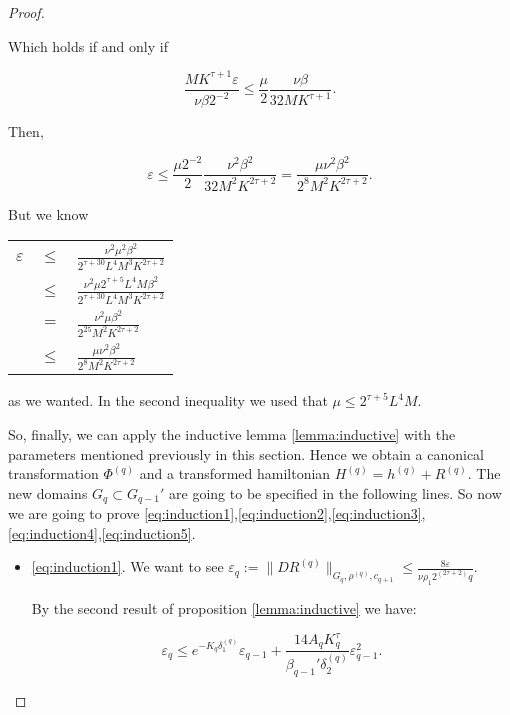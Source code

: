 \begin{proof}
\begin{enumerate}
\begin{itemize}
\begin{enumerate}
Which holds if and only if

$$\frac{M K^{\tau+1} \varepsilon}{\nu \beta 2^{-2}} \leq \frac{\mu}{2}\frac{\nu \beta}{32 M K^{\tau+1}}.$$

Then,

$$\varepsilon \leq \frac{\mu 2^{-2}}{2}\frac{\nu^2 \beta^2}{32 M^2 K^{2\tau+2}} = \frac{\mu \nu^2 \beta^2}{2^8 M^2 K^{2\tau+2}}.$$


But we know

\begin{longtable}{rcl}
$\varepsilon $ & $\leq$ & $\frac{\nu^2 \mu^2 \beta^2}{2^{\tau+30} L^4 M^3 K^{2\tau+2}}$ \\
& $\leq$ & $\frac{\nu^2 \mu 2^{\tau+5}L^4M\beta^2}{2^{\tau+30}L^4 M^3 K^{2\tau+2}}$ \\
& $=$ & $\frac{\nu^2 \mu \beta^2}{2^25 M^2 K^{2\tau+2}}$ \\
& $\leq$ & $\frac{\mu \nu^2 \beta^2}{2^8 M^2 K^{2\tau+2}}$ \\
\end{longtable}

as we wanted. In the second inequality we used that $\mu \leq 2^{\tau+5}L^4 M$.%

\end{enumerate}

So, finally, we can apply the inductive lemma \ref{lemma:inductive} with the parameters mentioned previously in this section. Hence we obtain a canonical transformation $\Phi^{(q)}$ and a transformed hamiltonian $H^{(q)} = h^{(q)} + R^{(q)}$.
The new domains $G_q \subset G_{q-1}'$ are going to be specified in the following lines. So now we are going to prove \ref{eq:induction1},\ref{eq:induction2},\ref{eq:induction3},\ref{eq:induction4},\ref{eq:induction5}.

\begin{itemize}
\item \ref{eq:induction1}. We want to see $\varepsilon_q := \|DR^{(q)}\|_{G_q, \rho^{(q)}, c_{q+1}} \leq \frac{8 \varepsilon}{\nu \rho_1 2^(2\tau+2)q}$.

By the second result of proposition \ref{lemma:inductive} we have:

\begin{equation}\label{eq:1qtobound}
\varepsilon_q \leq e^{-K_q \delta_1^{(q)}}\varepsilon_{q-1} + \frac{14 A_q K_q^\tau}{\beta_{q-1}'\delta_2^{(q)}} \varepsilon_{q-1}^2.
\end{equation}



\end{itemize}
\end{itemize}
\end{enumerate}
\end{proof}
